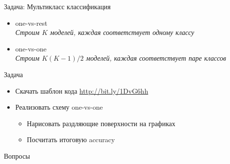 \documentclass[10pt]{beamer}
\begin{document}
\begin{frame}{Задача: Мультикласс классификация}

\begin{itemize}
\item one-vs-rest \\
{\it Строим $K$ моделей, каждая соответствует одному классу}
\item one-vs-one \\
{\it Строим $K(K-1)/2$ моделей, каждая соответствует паре классов}
\end{itemize}

Задача
\begin{itemize}
\item Скачать шаблон кода \url{http://bit.ly/1DvG6hh}
\item Реализовать схему one-vs-one
\begin{itemize}
\item Нарисовать раздляющие поверхности на графиках
\item Посчитать итоговую accuracy
\end{itemize}
\end{itemize}

\end{frame}

\begin{frame}

\begin{center}
\Large Вопросы
\end{center}

\end{frame}
\end{document}
